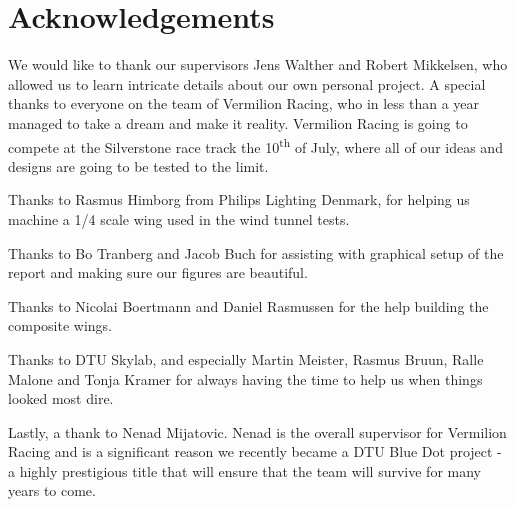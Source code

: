 \chapter*{Acknowledgements}

We would like to thank our supervisors Jens Walther and Robert Mikkelsen, who allowed us to learn intricate details about our own personal project. A special thanks to everyone on the team of Vermilion Racing, who in less than a year managed to take a dream and make it reality. Vermilion Racing is going to compete at the Silverstone race track the 10\textsuperscript{th} of July, where all of our ideas and designs are going to be tested to the limit.

Thanks to Rasmus Himborg from Philips Lighting Denmark, for helping us machine a 1/4 scale wing used in the wind tunnel tests.

Thanks to Bo Tranberg and Jacob Buch for assisting with graphical setup of the report and making sure our figures are beautiful.

Thanks to Nicolai Boertmann and Daniel Rasmussen for the help building the composite wings.

Thanks to DTU Skylab, and especially Martin Meister, Rasmus Bruun, Ralle Malone and Tonja Kramer for always having the time to help us when things looked most dire.

Lastly, a thank to Nenad Mijatovic. Nenad is the overall supervisor for Vermilion Racing and is a significant reason we recently became a DTU Blue Dot project - a highly prestigious title that will ensure that the team will survive for many years to come.

\begin{figure}
  \label{fig:sponsorstack}
\end{figure}
